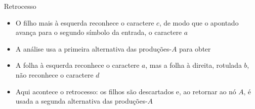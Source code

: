 \begin{frame}[fragile]{Retrocesso}

    \begin{itemize}
        \item O filho mais à esquerda reconhece o caractere $c$, de modo que o apontado avança para o segundo símbolo da entrada, o caractere $a$
        \pause

        \item A análise usa a primeira alternativa das produções-$A$ para obter
        \begin{center}
        \end{center}
        \pause

        \item A folha à esquerda reconhece o caractere $a$, mas a folha à direita, rotulada $b$, não reconhece o caractere $d$
        \pause

        \item Aqui acontece o retrocesso: os filhos são descartados e, ao retornar ao nó $A$, é usada a segunda alternativa das produções-$A$ 
    \end{itemize}

\end{frame}

